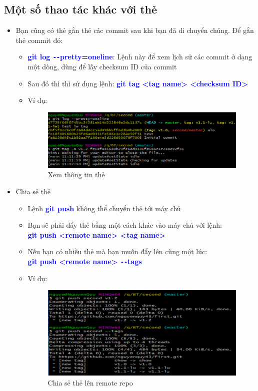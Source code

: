 \documentclass[12pt,a4paper]{report}
\begin{document}
\subsection{Một số thao tác khác với thẻ}
\begin{itemize}
\item Bạn cũng có thẻ gắn thẻ các commit sau khi bạn đã di chuyển chúng. Để gắn thẻ commit đó:
\begin{itemize}
\item \textcolor{blue}{\bf git log \texttt{-{}-}pretty=oneline}: Lệnh này để xem lịch sử các commit ở dạng một dòng, dùng để lấy checksum ID của commit
\item Sau đó thì thì sử dụng lệnh: \textcolor{blue}{\bf git tag <tag name> <checksum ID>}
\item Ví dụ: 

\begin{figure}[!ht]
	\centering
	\includegraphics[width=0.8\linewidth]{screenshot044}
\caption{Xem thông tin thẻ}
	\label{fig:screenshot044}
	\end{figure}
	
\end{itemize}
\item Chia sẻ thẻ
\begin{itemize}
\item Lệnh \textcolor{blue}{\bf git push} không thể chuyển thẻ tới máy chủ
\item Bạn sẽ phải đẩy thẻ bằng một cách khác vào máy chủ với lệnh:\\ \textcolor{blue}{\bf git push <remote name> <tag name>}
\item Nếu bạn có nhiều thẻ mà bạn muốn đẩy lên cùng một lúc:\\ \textcolor{blue}{\bf git push <remote name> \texttt{-{}-}tags}
\item Ví dụ:

\begin{figure}[!ht]
	\centering
	\includegraphics[width=0.8\linewidth]{screenshot045}
\caption{Chia sẻ thẻ lên remote repo}
	\label{fig:screenshot045}
	\end{figure}
	

\end{itemize}
\end{itemize}
\end{document}
